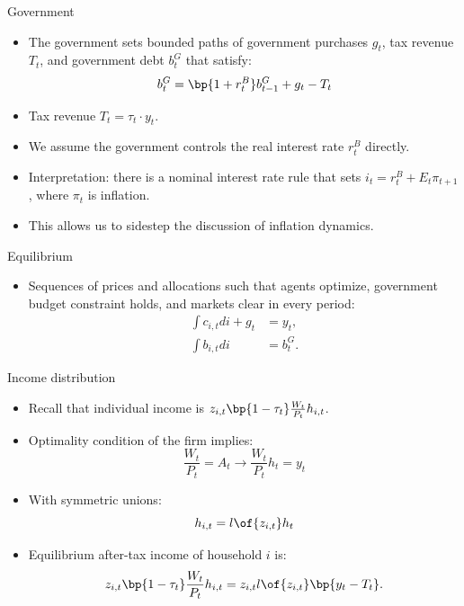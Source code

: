 \documentclass[11pt,xcolor={dvipsnames},aspectratio=159,hyperref={pdftex,pdfpagemode=UseNone,hidelinks,pdfdisplaydoctitle=true},usepdftitle=false]{beamer}
\begin{document}
\begin{frame}{Government}
    \begin{itemize}
     \item The government sets bounded paths of government purchases $g_t$, tax revenue $T_t$, and government debt $b^G_t$ that satisfy:
        \begin{align*}
        b^G_t = \bp{1+r^B_t} b^G_{t-1} + g_t - T_t \end{align*} \vspace{-1cm}
            \item Tax revenue $T_t = \tau_t \cdot y_t$.
            \item We assume the government controls the real interest rate $r^B_t$ directly. 
            \item Interpretation: there is a nominal interest rate rule that sets $i_t = r^B_t + E_t\pi_{t+1}$, where $\pi_t$ is inflation.
            \item This allows us to sidestep the discussion of inflation dynamics. 
        \end{itemize}
\end{frame}




\begin{frame}{Equilibrium}
    \begin{itemize}
     \item Sequences of prices and allocations such that agents optimize, government budget constraint holds, and markets clear in every period: 
        \begin{align*}
        \int c_{i,t} di + g_t & = y_t, \\
        \int b_{i,t} di & = b^G_t.
        \end{align*} 
    \end{itemize}
\end{frame}

\begin{frame}{Income distribution}
    \begin{itemize}
     \item Recall that individual income is $z_{i,t} \bp{1-\tau_t}\frac{W_t}{P_t} h_{i,t}$.
     \item Optimality condition of the firm implies: $$\frac{W_t}{P_t} = A_t \rightarrow \frac{W_t}{P_t} h_t = y_t$$
     \item With symmetric unions:  $$h_{i,t} = l\of{z_{i,t}}h_t$$
     \item Equilibrium after-tax income of household $i$ is: \begin{align*}
            z_{i,t} \bp{1-\tau_t}\frac{W_t}{P_t} h_{i,t} = z_{i,t} l\of{z_{i,t}}\bp{y_t - T_t}.
     \end{align*}
        \end{itemize}
\end{frame}
\end{document}
